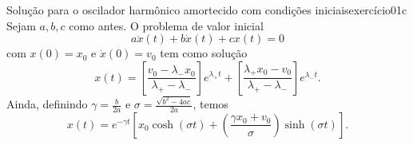 \begin{proposition}{Solução para o oscilador harmônico amortecido com condições iniciais}{exercício01c}
    Sejam \(a,b,c\) como antes. O problema de valor inicial
    \begin{equation*}
        a \ddot{x}(t) + b \dot{x}(t) + cx(t) = 0
    \end{equation*}
    com \(x(0) = x_0\) e \(\dot{x}(0) = v_0\) tem como solução
    \begin{equation*}
        x(t) = \left[\frac{v_0 - \lambda_- x_0}{\lambda_+ - \lambda_-}\right]e^{\lambda_+ t} + \left[\frac{\lambda_+ x_0 - v_0}{\lambda_+ - \lambda_-}\right]e^{\lambda_- t}.
    \end{equation*}
    Ainda, definindo \(\gamma = \frac{b}{2a}\) e \(\sigma = \frac{\sqrt{b^2 - 4ac}}{2a}\), temos
    \begin{equation*}
        x(t) = e^{-\gamma t} \left[x_0\cosh(\sigma t) + \left(\frac{\gamma x_0 + v_0}{\sigma}\right)\sinh(\sigma t)\right].
    \end{equation*}
\end{proposition}
